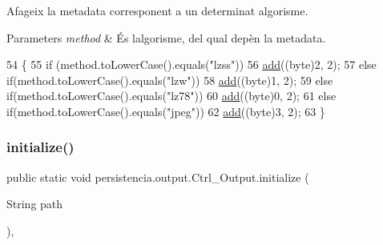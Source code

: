 Afageix la metadata corresponent a un determinat algorisme. 


\begin{DoxyParams}{Parameters}
{\em method} & És l\textquotesingle{}algorisme, del qual depèn la metadata. \\
\hline
\end{DoxyParams}

\begin{DoxyCode}
54                                            \{
55         \textcolor{keywordflow}{if} (method.toLowerCase().equals(\textcolor{stringliteral}{"lzss"}))
56             \hyperlink{classpersistencia_1_1output_1_1Ctrl__Output_a8c5aa5a6acb5259faeb1c05c71ddd21c}{add}((byte)2, 2);
57         \textcolor{keywordflow}{else} \textcolor{keywordflow}{if}(method.toLowerCase().equals(\textcolor{stringliteral}{"lzw"}))
58             \hyperlink{classpersistencia_1_1output_1_1Ctrl__Output_a8c5aa5a6acb5259faeb1c05c71ddd21c}{add}((byte)1, 2);
59         \textcolor{keywordflow}{else} \textcolor{keywordflow}{if}(method.toLowerCase().equals(\textcolor{stringliteral}{"lz78"}))
60             \hyperlink{classpersistencia_1_1output_1_1Ctrl__Output_a8c5aa5a6acb5259faeb1c05c71ddd21c}{add}((byte)0, 2);
61         \textcolor{keywordflow}{else} \textcolor{keywordflow}{if}(method.toLowerCase().equals(\textcolor{stringliteral}{"jpeg"}))
62             \hyperlink{classpersistencia_1_1output_1_1Ctrl__Output_a8c5aa5a6acb5259faeb1c05c71ddd21c}{add}((byte)3, 2);
63     \}
\end{DoxyCode}
\mbox{\label{classpersistencia_1_1output_1_1Ctrl__Output_a83bd01197acdeb0a697f21ca9854c457}} 
\subsubsection{\texorpdfstring{initialize()}{initialize()}}
{\footnotesize\ttfamily public static void persistencia.\+output.\+Ctrl\+\_\+\+Output.\+initialize (\begin{DoxyParamCaption}\item[{String}]{path }\end{DoxyParamCaption})\hspace{0.3cm}{\ttfamily [inline]}, {\ttfamily [static]}}



